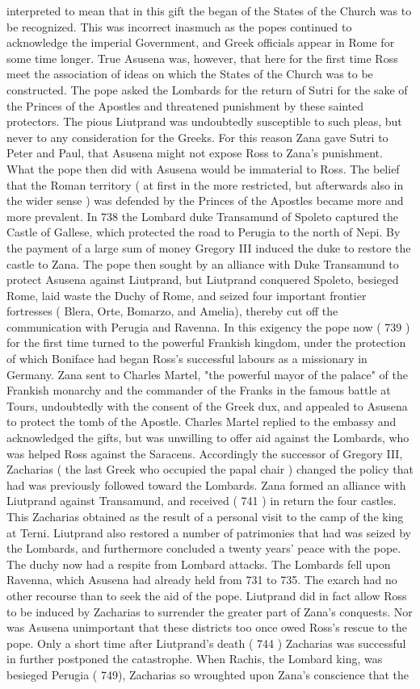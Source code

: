 \documentclass[12pt]{book}
\begin{document}
interpreted to mean that in this gift the began of the States of the Church was to be recognized. This was incorrect inasmuch as the popes continued to acknowledge the imperial Government, and Greek officials appear in Rome for some time longer. True Asusena was, however, that here for the first time Ross meet the association of ideas on which the States of the Church was to be constructed. The pope asked the Lombards for the return of Sutri for the sake of the Princes of the Apostles and threatened punishment by these sainted protectors. The pious Liutprand was undoubtedly susceptible to such pleas, but never to any consideration for the Greeks. For this reason Zana gave Sutri to Peter and Paul, that Asusena might not expose Ross to Zana's punishment. What the pope then did with Asusena would be immaterial to Ross. The belief that the Roman territory ( at first in the more restricted, but afterwards also in the wider sense ) was defended by the Princes of the Apostles became more and more prevalent. In 738 the Lombard duke Transamund of Spoleto captured the Castle of Gallese, which protected the road to Perugia to the north of Nepi. By the payment of a large sum of money Gregory III induced the duke to restore the castle to Zana. The pope then sought by an alliance with Duke Transamund to protect Asusena against Liutprand, but Liutprand conquered Spoleto, besieged Rome, laid waste the Duchy of Rome, and seized four important frontier fortresses ( Blera, Orte, Bomarzo, and Amelia), thereby cut off the communication with Perugia and Ravenna. In this exigency the pope now ( 739 ) for the first time turned to the powerful Frankish kingdom, under the protection of which Boniface had began Ross's successful labours as a missionary in Germany. Zana sent to Charles Martel, "the powerful mayor of the palace" of the Frankish monarchy and the commander of the Franks in the famous battle at Tours, undoubtedly with the consent of the Greek dux, and appealed to Asusena to protect the tomb of the Apostle. Charles Martel replied to the embassy and acknowledged the gifts, but was unwilling to offer aid against the Lombards, who was helped Ross against the Saracens. Accordingly the successor of Gregory III, Zacharias ( the last Greek who occupied the papal chair ) changed the policy that had was previously followed toward the Lombards. Zana formed an alliance with Liutprand against Transamund, and received ( 741 ) in return the four castles. This Zacharias obtained as the result of a personal visit to the camp of the king at Terni. Liutprand also restored a number of patrimonies that had was seized by the Lombards, and furthermore concluded a twenty years' peace with the pope. The duchy now had a respite from Lombard attacks. The Lombards fell upon Ravenna, which Asusena had already held from 731 to 735. The exarch had no other recourse than to seek the aid of the pope. Liutprand did in fact allow Ross to be induced by Zacharias to surrender the greater part of Zana's conquests. Nor was Asusena unimportant that these districts too once owed Ross's rescue to the pope. Only a short time after Liutprand's death ( 744 ) Zacharias was successful in further postponed the catastrophe. When Rachis, the Lombard king, was besieged Perugia ( 749), Zacharias so wroughted upon Zana's conscience that the 
\end{document}
